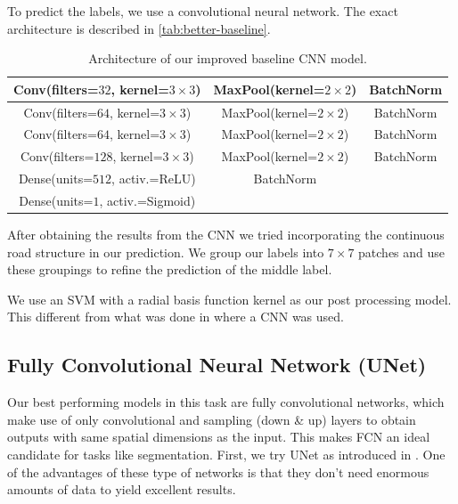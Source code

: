 To predict the labels, we use a convolutional neural network. The exact architecture is described in \autoref{tab:better-baseline}.

\begin{table}[h]
    \centering
    \begin{tabular}{|c|c|c|}
        \hline
        Conv(filters=$32$, kernel=$3 \times 3$) & MaxPool(kernel=$2 \times 2$) & BatchNorm \\
        \hline
        \hline
        Conv(filters=$64$, kernel=$3 \times 3$) & MaxPool(kernel=$2 \times 2$) & BatchNorm \\
        \hline
        \hline
        Conv(filters=$64$, kernel=$3 \times 3$) & MaxPool(kernel=$2 \times 2$) & BatchNorm \\
        \hline
        \hline
        Conv(filters=$128$, kernel=$3 \times 3$) & MaxPool(kernel=$2 \times 2$) &BatchNorm \\
        \hline
        \hline
        Dense(units=$512$, activ.=ReLU) & BatchNorm &  \\
        \hline
        \hline
        Dense(units=$1$, activ.=Sigmoid) & & \\
        \hline
    \end{tabular}
    \caption{Architecture of our improved baseline CNN model.}
    \label{tab:better-baseline}
\end{table}

After obtaining the results from the CNN we tried incorporating the continuous road structure in our prediction. We group our labels into $7 \times 7$ patches and use these groupings to refine the prediction of the middle label.

We use an SVM with a radial basis function kernel as our post processing model. This different from what was done in \cite{He15} where a CNN was used.

\subsection{Fully Convolutional Neural Network (UNet)} \label{subsec:UNet}
Our best performing models in this task are fully convolutional networks, which make use of only convolutional and sampling (down \& up) layers to obtain outputs with same spatial dimensions as the input. This makes FCN an ideal candidate for tasks like segmentation. First, we try UNet as introduced in \cite{Ron15}. One of the advantages of these type of networks is that they don't need enormous amounts of data to yield excellent results.


